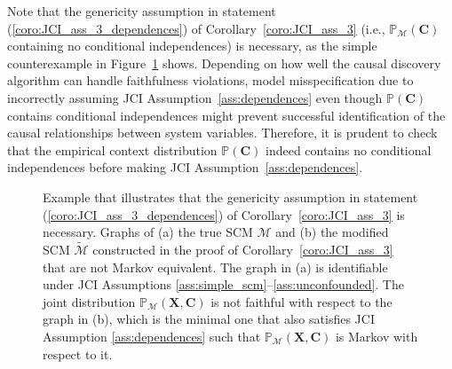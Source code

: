 \documentclass[twoside,11pt]{article}
\newcommand{\Prb}{\mathbb{P}}
\newcommand\B[1]{\bm{#1}}
\newcommand\C[1]{\mathcal{#1}}
\begin{document}
Note that the genericity assumption in statement (\ref{coro:JCI_ass_3_dependences}) of Corollary~\ref{coro:JCI_ass_3}
(i.e., $\Prb_{\C{M}}(\B{C})$ containing no conditional independences) is necessary,
as the simple counterexample in Figure~\ref{fig:JCI_independent_contexts} shows.
Depending on how well the causal discovery algorithm can handle faithfulness violations, 
model misspecification due to incorrectly
assuming JCI Assumption~\ref{ass:dependences} even though $\Prb(\B{C})$ contains conditional 
independences might prevent successful identification of the causal relationships between system variables.
Therefore, it is prudent to check that the empirical context distribution $\Prb(\B{C})$ indeed contains
no conditional independences before making JCI Assumption~\ref{ass:dependences}.
\begin{figure}\centering
  \caption{Example that illustrates that
  the genericity assumption in statement (\ref{coro:JCI_ass_3_dependences}) of Corollary~\ref{coro:JCI_ass_3} is necessary.
  Graphs of (a) the true SCM $\C{M}$ and (b) the modified SCM $\tilde{\C{M}}$ constructed in the
  proof of Corollary~\ref{coro:JCI_ass_3} that are not Markov equivalent.
  The graph in (a) is identifiable under JCI Assumptions \ref{ass:simple_scm}--\ref{ass:unconfounded}. The joint distribution
  $\Prb_{\C{M}}(\B{X},\B{C})$ is not faithful with respect to the graph in (b), which is the minimal one that also satisfies JCI Assumption \ref{ass:dependences} such that $\Prb_{\C{M}}(\B{X},\B{C})$ is Markov with respect to it.\label{fig:JCI_independent_contexts}}
\end{figure}
\end{document}
